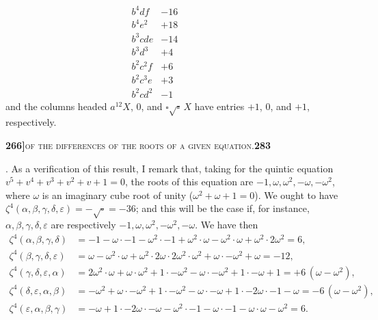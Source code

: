 \documentclass[11pt]{article}
\begin{document}
\[\begin{array}{rrcrrcrr}
b^4 d f         & -16  & &                &     & &           &\\
b^4 e^2         & +18  & &                &     & &           &\\
b^3 c d e       & -14  & &                &     & &           &\\
b^3 d^3         & +4   & &                &     & &           &\\
b^2 c^2 f       & +6   & &                &     & &           &\\
b^2 c^3 e       & +3   & &                &     & &           &\\
b^2 c d^2       & -1   & &                &     & &           &
\end{array}
\]
and the columns headed $a^{12}X$, $0$, and $\square\sqrt{\square}\,X$ have entries $+1$, $0$, and $+1$, respectively.

\newpage
\setcounter{page}{283}

\noindent\textbf{266]}\hfill\textsc{of the differences of the roots of a given equation.}\hfill\textbf{283}

\medskip

. As a verification of this result, I remark that, taking for the quintic equation $v^5 + v^4 + v^3 + v^2 + v + 1 = 0$, the roots of this equation are $-1, \omega, \omega^2, -\omega, -\omega^2$, where $\omega$ is an imaginary cube root of unity ($\omega^2 + \omega + 1 = 0$). We ought to have $\zeta^4(\alpha, \beta, \gamma, \delta, \varepsilon) = -\sqrt{\square} = -36$; and this will be the case if, for instance, $\alpha, \beta, \gamma, \delta, \varepsilon$ are respectively $-1, \omega, \omega^2, -\omega^2, -\omega$. We have then
\[
\begin{aligned}
\zeta^4(\alpha, \beta, \gamma, \delta) &= -1-\omega\cdot-1-\omega^2\cdot-1+\omega^2\cdot\omega-\omega^2\cdot\omega+\omega^2\cdot 2\omega^2 = 6,\\
\zeta^4(\beta, \gamma, \delta, \varepsilon) &= \omega-\omega^2\cdot\omega+\omega^2\cdot 2\omega\cdot 2\omega^2\cdot\omega^2+\omega\cdot-\omega^2+\omega = -12,\\
\zeta^4(\gamma, \delta, \varepsilon, \alpha) &= 2\omega^2\cdot\omega+\omega\cdot\omega^2+1\cdot-\omega^2-\omega\cdot-\omega^2+1\cdot-\omega+1 = +6\,(\omega - \omega^2),\\
\zeta^4(\delta, \varepsilon, \alpha, \beta) &= -\omega^2+\omega\cdot-\omega^2+1\cdot-\omega^2-\omega\cdot-\omega+1\cdot-2\omega\cdot-1-\omega = -6\,(\omega - \omega^2),\\
\zeta^4(\varepsilon, \alpha, \beta, \gamma) &= -\omega+1\cdot-2\omega\cdot-\omega-\omega^2\cdot-1-\omega\cdot-1-\omega\cdot\omega-\omega^2 = 6.
\end{aligned}
\]
\end{document}
